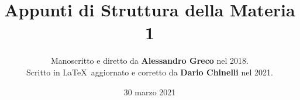 \documentclass[11pt]{article}
\begin{document}
\title{\textbf{Appunti di Struttura della Materia 1}} 

\author{Manoscritto e diretto da \textbf{Alessandro Greco} nel 2018. \\
Scritto in \LaTeX\ aggiornato e corretto da \textbf{Dario Chinelli} nel 2021.}

\date{30 marzo 2021}

\maketitle

    \newpage

    \tableofcontents

    
    

    

    

    

    

    

    
    

    
\iffalse
    
    
    
    
    
    
    
    
    
    
    
    
    
    
    
    
    
    
    
\fi
\end{document}
